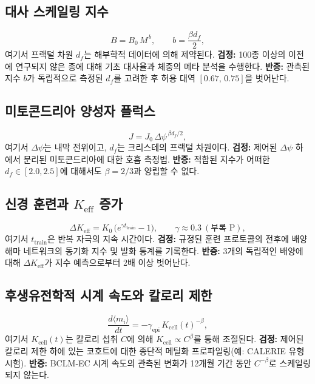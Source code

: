 \documentclass[11pt,a4paper]{article}
\begin{document}
	\subsection{대사 스케일링 지수}
	
	\begin{equation}\label{eq:pred-metab}
		B = B_0\,M^{\,b}, \qquad
		b = \frac{\beta d_f}{2},
	\end{equation}
	여기서 프랙털 차원 \(d_f\)는 해부학적 데이터에 의해 제약된다.
	\textbf{검정:} 100종 이상의 이전에 연구되지 않은 종에 대해 기초 대사율과 체중의 메타 분석을 수행한다.
	\textbf{반증:} 관측된 지수 \(b\)가 독립적으로 측정된 \(d_f\)를 고려한 후 허용 대역 \([0.67,\,0.75]\)을 벗어난다.
	
	\subsection{미토콘드리아 양성자 플럭스}
	
	\begin{equation}\label{eq:pred-mito}
		J = J_0\,\Delta\psi^{\,\beta d_f/2},
	\end{equation}
	여기서 \(\Delta\psi\)는 내막 전위이고, \(d_f\)는 크리스테의 프랙털 차원이다.
	\textbf{검정:} 제어된 \(\Delta\psi\) 하에서 분리된 미토콘드리아에 대한 호흡 측정법.
	\textbf{반증:} 적합된 지수가 어떠한 \(d_f\in[2.0,2.5]\)에 대해서도 \(\beta=2/3\)과 양립할 수 없다.
	
	\subsection{신경 훈련과 \(K_{\mathrm{eff}}\) 증가}
	
	\begin{equation}\label{eq:pred-neural}
		\Delta K_{\mathrm{eff}} = K_0\,
		\bigl(e^{\gamma t_{\mathrm{train}}}-1\bigr),\qquad
		\gamma \approx 0.3\ (\text{부록~P}),
	\end{equation}
	여기서 \(t_{\mathrm{train}}\)은 반복 자극의 지속 시간이다.
	\textbf{검정:} 규정된 훈련 프로토콜의 전후에 배양 해마 네트워크의 동기화 지수 및 발화 통계를 기록한다.
	\textbf{반증:} 3개의 독립적인 배양에 대해 \(\Delta K_{\mathrm{eff}}\)가 지수 예측으로부터 2배 이상 벗어난다.
	
	\subsection{후생유전학적 시계 속도와 칼로리 제한}
	
	\begin{equation}\label{eq:pred-epi}
		\frac{d\langle m_i\rangle}{dt} =
		-\gamma_{\mathrm{epi}}\, K_{\mathrm{cell}}(t)^{-\beta},
	\end{equation}
	여기서 \(K_{\mathrm{cell}}(t)\)는 칼로리 섭취 \(C\)에 의해 \(K_{\mathrm{cell}} \propto C^{\beta}\)를 통해 조절된다.
	\textbf{검정:} 제어된 칼로리 제한 하에 있는 코호트에 대한 종단적 메틸화 프로파일링(예: CALERIE 유형 시험).
	\textbf{반증:} BCLM‑EC 시계 속도의 관측된 변화가 12개월 기간 동안 \(C^{-\beta}\)로 스케일링되지 않는다.
	
\end{document}
